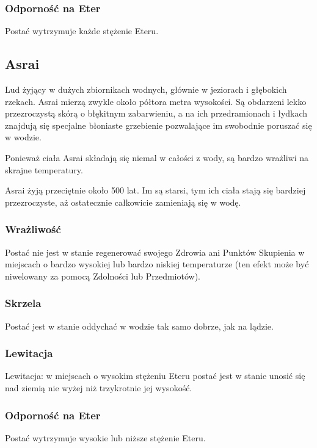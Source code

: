 \documentclass[10pt,a4paper]{book}
\begin{document}
\begin{multicols}{2}
\subsubsection*{Odporność na Eter}
Postać wytrzymuje każde stężenie Eteru.




\subsection*{Asrai}
Lud żyjący w dużych zbiornikach wodnych, głównie w jeziorach i głębokich rzekach. Asrai mierzą zwykle około półtora metra wysokości. Są obdarzeni lekko przezroczystą skórą o błękitnym zabarwieniu, a na ich przedramionach i łydkach znajdują się specjalne błoniaste grzebienie pozwalające im swobodnie poruszać się w wodzie.

Ponieważ ciała Asrai składają się niemal w całości z wody, są bardzo wrażliwi na skrajne temperatury.

Asrai żyją przeciętnie około 500 lat. Im są starsi, tym ich ciała stają się bardziej przezroczyste, aż ostatecznie całkowicie zamieniają się w wodę.

\subsubsection*{Wrażliwość}
Postać nie jest w stanie regenerować swojego Zdrowia ani Punktów Skupienia w miejscach o bardzo wysokiej lub bardzo niskiej temperaturze (ten efekt może być niwelowany za pomocą Zdolności lub Przedmiotów).

\subsubsection*{Skrzela}
Postać jest w stanie oddychać w wodzie tak samo dobrze, jak na lądzie.

\subsubsection*{Lewitacja}
Lewitacja: w miejscach o wysokim stężeniu Eteru postać jest w stanie unosić się nad ziemią nie wyżej niż trzykrotnie jej wysokość.

\subsubsection*{Odporność na Eter}
Postać wytrzymuje wysokie lub niższe stężenie Eteru.


\end{multicols}
\end{document}
